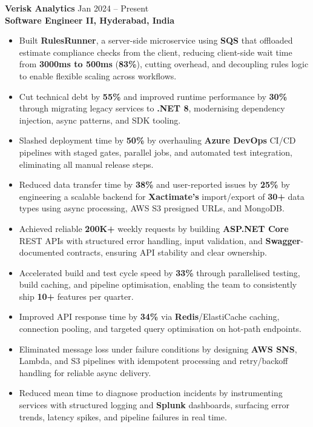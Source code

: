 \documentclass[a4paper,10pt]{article}
\begin{document}
\textbf{Verisk Analytics} \hfill Jan 2024 -- Present \\
\textbf{Software Engineer II, Hyderabad, India}
\begin{itemize}[leftmargin=*]
    \item Built \textbf{RulesRunner}, a server-side microservice using \textbf{SQS} that offloaded estimate compliance checks from the client, reducing client-side wait time from \textbf{3000ms to 500ms} (\textbf{83\%}), cutting overhead, and decoupling rules logic to enable flexible scaling across workflows.
    \item Cut technical debt by \textbf{55\%} and improved runtime performance by \textbf{30\%} through migrating legacy services to \textbf{.NET 8}, modernising dependency injection, async patterns, and SDK tooling.
    \item Slashed deployment time by \textbf{50\%} by overhauling \textbf{Azure DevOps} CI/CD pipelines with staged gates, parallel jobs, and automated test integration, eliminating all manual release steps.
    \item Reduced data transfer time by \textbf{38\%} and user-reported issues by \textbf{25\%} by engineering a scalable backend for \textbf{Xactimate's} import/export of \textbf{30+} data types using async processing, AWS S3 presigned URLs, and MongoDB.
    \item Achieved reliable \textbf{200K+} weekly requests by building \textbf{ASP.NET Core} REST APIs with structured error handling, input validation, and \textbf{Swagger}-documented contracts, ensuring API stability and clear ownership.
    \item Accelerated build and test cycle speed by \textbf{33\%} through parallelised testing, build caching, and pipeline optimisation, enabling the team to consistently ship \textbf{10+} features per quarter.
    \item Improved API response time by \textbf{34\%} via \textbf{Redis}/ElastiCache caching, connection pooling, and targeted query optimisation on hot-path endpoints.
    \item Eliminated message loss under failure conditions by designing \textbf{AWS SNS}, Lambda, and S3 pipelines with idempotent processing and retry/backoff handling for reliable async delivery.
    \item Reduced mean time to diagnose production incidents by instrumenting services with structured logging and \textbf{Splunk} dashboards, surfacing error trends, latency spikes, and pipeline failures in real time.
\end{itemize}
\end{document}
